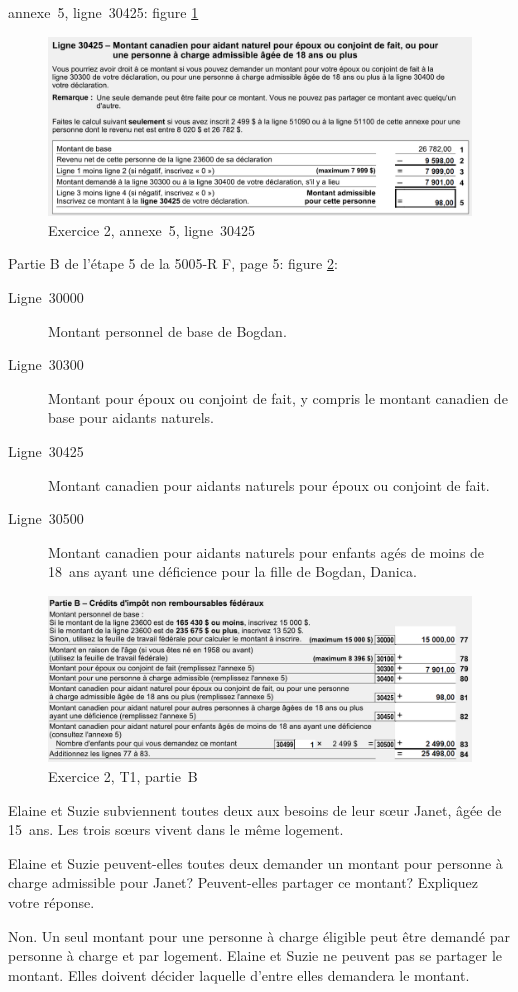 annexe~5, ligne~30425: figure \ref{fig:chap4Exercice2Q130425}
\begin{figure}
	\centering
	\includegraphics[width=.9\textwidth]{exercice/4-2/Q1/30425.png}
	\caption[]{Exercice 2, annexe~5, ligne~30425}
	\label{fig:chap4Exercice2Q130425}
\end{figure}

Partie B de l'étape 5 de la 5005-R F, page 5: figure \ref{fig:chap4Exercice2Q1T1B}:
\begin{description}
	\item[Ligne~30000] Montant personnel de base de Bogdan.
	\item[Ligne~30300] Montant pour époux ou conjoint de fait, y compris le montant canadien de base pour aidants naturels.
	\item[Ligne~30425] Montant canadien pour aidants naturels pour époux ou conjoint de fait.
	\item[Ligne~30500] Montant canadien pour aidants naturels pour enfants  agés de moins de 18~ans ayant une déficience pour la fille de Bogdan, Danica.
\end{description}
\begin{figure}
	\centering
	\includegraphics[width=.9\textwidth]{exercice/4-2/Q1/T1PartieB.png}
	\caption[]{Exercice 2, T1, partie~B}
	\label{fig:chap4Exercice2Q1T1B}
\end{figure}

\begin{question}
	Elaine et Suzie subviennent toutes deux aux besoins de leur sœur Janet, âgée de 15~ans. Les trois sœurs vivent dans le même logement. 
	
	Elaine et Suzie peuvent-elles toutes deux demander un montant pour personne à charge admissible pour Janet? Peuvent-elles partager ce montant? Expliquez votre réponse.
\end{question}
Non. Un seul montant pour une personne à charge éligible peut être demandé par personne à charge et par logement. Elaine et Suzie ne peuvent pas se partager le montant. Elles doivent décider laquelle d'entre elles demandera le montant.

